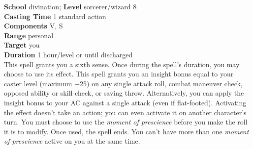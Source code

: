\textbf{School} divination; \textbf{Level} sorcerer/wizard 8\\
\textbf{Casting Time} 1 standard action\\
\textbf{Components} V, S\\
\textbf{Range} personal\\
\textbf{Target} you\\
\textbf{Duration} 1 hour/level or until discharged\\
This spell grants you a sixth sense. Once during the spell's duration, you may choose to use its effect. This spell grants you an insight bonus equal to your caster level (maximum +25) on any single attack roll, combat maneuver check, opposed ability or skill check, or saving throw. Alternatively, you can apply the insight bonus to your AC against a single attack (even if flat-footed). Activating the effect doesn't take an action; you can even activate it on another character's turn. You must choose to use the \textit{moment of prescience }before you make the roll it is to modify. Once used, the spell ends. You can't have more than one \textit{moment of prescience }active on you at the same time.\\

